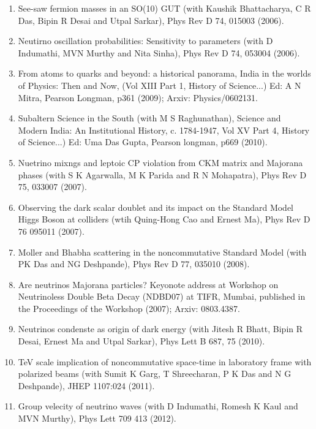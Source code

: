 \begin{enumerate}
\item See-saw fermion masses in an SO(10) GUT (with Kaushik Bhattacharya, C R Das, Bipin R Desai and Utpal Sarkar), Phys Rev D 74, 015003 (2006).

\item Neutirno oscillation probabilities:  Sensitivity to parameters (with D Indumathi, MVN Murthy and Nita Sinha), Phys Rev D 74, 053004 (2006).

\item From atoms to quarks and beyond: a historical panorama, India in the worlds of Physics: Then and Now, (Vol XIII Part 1, History of Science...) Ed: A N Mitra, Pearson Longman, p361 (2009); Arxiv: Physics/0602131.

\item Subaltern Science in the South (with M S Raghunathan), Science and Modern India: An Institutional History, c. 1784-1947, Vol XV Part 4, History of Science...) Ed: Uma Das Gupta, Pearson longman, p669 (2010).

\item Nuetrino mixngs and leptoic CP violation from CKM matrix and Majorana phases (with S K Agarwalla, M K Parida and R N Mohapatra), Phys Rev D 75, 033007 (2007).

\item Observing the dark scalar doublet and its impact on the Standard Model Higgs Boson at colliders (wtih Quing-Hong Cao and Ernest Ma), Phys Rev D 76 095011 (2007).

\item Moller and Bhabha scattering in the noncommutative Standard Model (with PK Das and NG Deshpande), Phys Rev D 77, 035010 (2008).

\item Are neutrinos Majorana particles?  Keyonote address at Workshop on Neutrinoless Double Beta Decay (NDBD07) at TIFR, Mumbai, published in the Proceedings of the Workshop (2007); Arxiv: 0803.4387.

\item Neutrinos condenste as origin of dark energy (with Jitesh R Bhatt, Bipin R Desai, Ernest Ma and Utpal Sarkar), Phys Lett B 687, 75 (2010).

\item TeV scale implication of noncommutative space-time in laboratory frame with polarized beams (with Sumit K Garg, T Shreecharan, P K Das and N G Deshpande), JHEP 1107:024 (2011).

\item Group velecity of neutrino waves (with D Indumathi, Romesh K Kaul and MVN Murthy), Phys Lett 709 413 (2012).


\end{enumerate}
